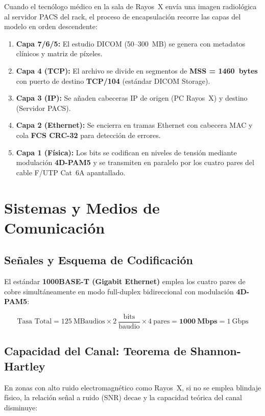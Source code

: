 Cuando el tecnólogo médico en la sala de Rayos~X envía una imagen radiológica al servidor PACS del rack, el proceso de encapsulación recorre las capas del modelo en orden descendente:

\begin{enumerate}[leftmargin=*, label=\arabic*.]
    \item \textbf{Capa 7/6/5:} El estudio DICOM (50--300~MB) se genera con metadatos clínicos y matriz de píxeles.
    \item \textbf{Capa 4 (TCP):} El archivo se divide en segmentos de \textbf{MSS = 1460~bytes} con puerto de destino \textbf{TCP/104} (estándar DICOM Storage).
    \item \textbf{Capa 3 (IP):} Se añaden cabeceras IP de origen (PC Rayos~X) y destino (Servidor PACS).
    \item \textbf{Capa 2 (Ethernet):} Se encierra en tramas Ethernet con cabecera MAC y cola \textbf{FCS CRC-32} para detección de errores.
    \item \textbf{Capa 1 (Física):} Los bits se codifican en niveles de tensión mediante modulación \textbf{4D-PAM5} y se transmiten en paralelo por los cuatro pares del cable F/UTP Cat~6A apantallado.
\end{enumerate}

\section{Sistemas y Medios de Comunicación}

\subsection{Señales y Esquema de Codificación}

El estándar \textbf{1000BASE-T (Gigabit Ethernet)} emplea los cuatro pares de cobre simultáneamente en modo full-duplex bidireccional con modulación \textbf{4D-PAM5}:

\begin{equation}
\text{Tasa Total} = 125~\text{MBaudios} \times 2~\frac{\text{bits}}{\text{baudio}} \times 4~\text{pares} = \mathbf{1000~\text{Mbps}} = 1~\text{Gbps}
\end{equation}

\subsection{Capacidad del Canal: Teorema de Shannon-Hartley}

En zonas con alto ruido electromagnético como Rayos~X, si no se emplea blindaje físico, la relación señal a ruido (SNR) decae y la capacidad teórica del canal disminuye:


